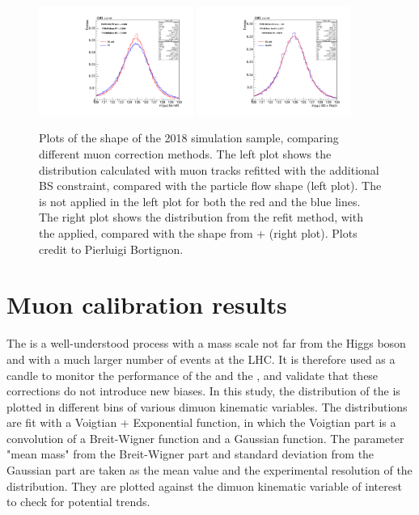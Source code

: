 \begin{figure}[!htb]
      \centering
      \captionsetup{justification=justified}
      \includegraphics[width=0.45\textwidth]{pics/muon_corr/GeoFit/track_refit/ggH_mass_muon_fit_bs_pf_2018.pdf}
      \includegraphics[width=0.45\textwidth]{pics/muon_corr/GeoFit/track_refit/ggH_mass_muon_fit_bs_geofit_2018.pdf}
      \caption{Plots of the \mmm shape of the 2018 \ggH simulation sample, comparing different muon correction methods.
               The left plot shows the \mmm distribution calculated with muon tracks refitted with the additional BS constraint, 
               compared with the particle flow shape (left plot).
               The \RochCorr is not applied in the left plot for both the red and the blue lines.
               The right plot shows the \mmm distribution from the refit method, with the \RochCorr applied,
               compared with the shape from \GeoFit + \RochCorr (right plot).
               Plots credit to Pierluigi Bortignon.}
      \label{fig:refit_vs_geofit}
\end{figure}

\section{Muon calibration results} \label{sec:muon_cal}

The \zmm is a well-understood process with a mass scale not far from the Higgs boson and with a much larger number of events at the LHC.
It is therefore used as a candle to monitor the performance of the \RochCorr and the \GeoFit, 
and validate that these corrections do not introduce new biases.
In this study, the distribution of the \mmm is plotted in different bins of various dimuon kinematic variables.
The \mmm distributions are fit with a Voigtian + Exponential function, 
in which the Voigtian part is a convolution of a Breit-Wigner function and a Gaussian function.
The parameter "mean mass" from the Breit-Wigner part and standard deviation from the Gaussian part are 
taken as the mean value and the experimental resolution of the \mmm distribution.
They are plotted against the dimuon kinematic variable of interest to check for potential trends.

